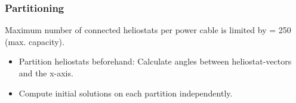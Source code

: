 \begin{frame}
\frametitle{Partitioning}
\begin{center}
Maximum number of connected heliostats per power cable is limited by = 250 (max. capacity).
\end{center}
\begin{itemize}
	\item Partition heliostats beforehand:
	 Calculate angles between heliostat-vectors and the x-axis.
	\item Compute initial solutions on each partition independently.
\end{itemize}
\end{frame}
